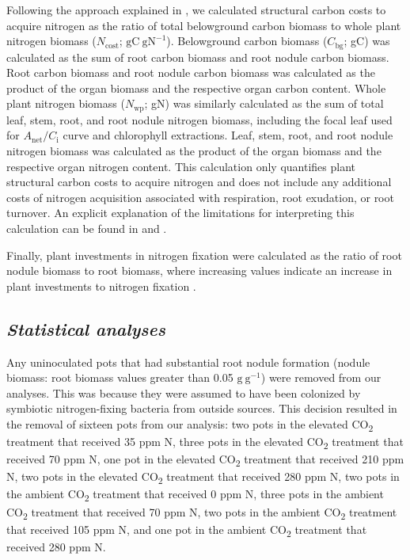     Following the approach explained in , we calculated structural carbon costs to acquire nitrogen as the ratio of total belowground carbon biomass to whole plant nitrogen biomass ($N_\mathrm{cost}$; $\mathrm{gC\ gN^{-1}}$). Belowground carbon biomass ($C_\mathrm{bg}$; gC) was calculated as the sum of root carbon biomass and root nodule carbon biomass. Root carbon biomass and root nodule carbon biomass was calculated as the product of the organ biomass and the respective organ carbon content. Whole plant nitrogen biomass ($N_\mathrm{wp}$; gN) was similarly calculated as the sum of total leaf, stem, root, and root nodule nitrogen biomass, including the focal leaf used for $A_\mathrm{{net}}/C_\mathrm{i}$ curve and chlorophyll extractions. Leaf, stem, root, and root nodule nitrogen biomass was calculated as the product of the organ biomass and the respective organ nitrogen content. This calculation only quantifies plant structural carbon costs to acquire nitrogen and does not include any additional costs of nitrogen acquisition associated with respiration, root exudation, or root turnover. An explicit explanation of the limitations for interpreting this calculation can be found in  and .

    Finally, plant investments in nitrogen fixation were calculated as the ratio of root nodule biomass to root biomass, where increasing values indicate an increase in plant investments to nitrogen fixation .

    \subsection{\textit{Statistical analyses}}
    
    Any uninoculated pots that had substantial root nodule formation (nodule biomass: root biomass values greater than 0.05 $\mathrm{g\ g^{-1}}$) were removed from our analyses. This was because they were assumed to have been colonized by symbiotic nitrogen-fixing bacteria from outside sources. This decision resulted in the removal of sixteen pots from our analysis: two pots in the elevated CO\textsubscript{2} treatment that received 35 ppm N, three pots in the elevated CO\textsubscript{2} treatment that received 70 ppm N, one pot in the elevated CO\textsubscript{2} treatment that received 210 ppm N, two pots in the elevated CO\textsubscript{2} treatment that received 280 ppm N, two pots in the ambient CO\textsubscript{2} treatment that received 0 ppm N, three pots in the ambient CO\textsubscript{2} treatment that received 70 ppm N, two pots in the ambient CO\textsubscript{2} treatment that received 105 ppm N, and one pot in the ambient CO\textsubscript{2} treatment that received 280 ppm N.

